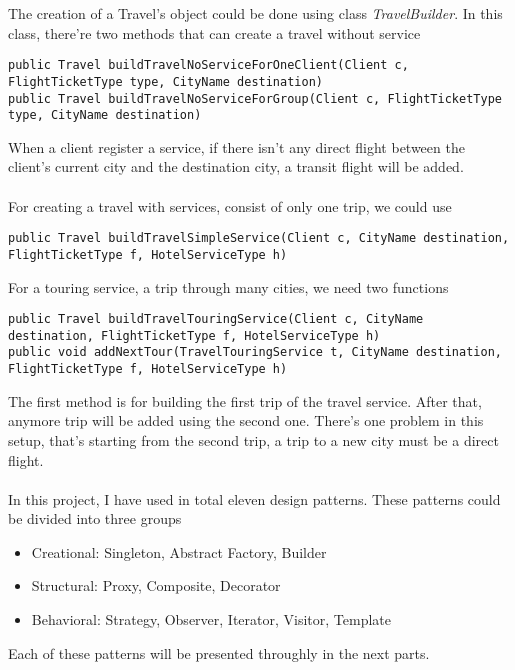 The creation of a Travel's object could be done using class \textit{TravelBuilder}. In this class, there're two methods that can create a travel without service

\begin{lstlisting}
public Travel buildTravelNoServiceForOneClient(Client c, FlightTicketType type, CityName destination)
public Travel buildTravelNoServiceForGroup(Client c, FlightTicketType type, CityName destination)
\end{lstlisting}

When a client register a service, if there isn't any direct flight between the client's current city and the destination city, a transit flight will be added.  

\paragraph{}
For creating a travel with services, consist of only one trip, we could use

\begin{lstlisting}
public Travel buildTravelSimpleService(Client c, CityName destination, FlightTicketType f, HotelServiceType h)
\end{lstlisting}

For a touring service, a trip through many cities, we need two functions

\begin{lstlisting}
public Travel buildTravelTouringService(Client c, CityName destination, FlightTicketType f, HotelServiceType h)
public void addNextTour(TravelTouringService t, CityName destination, FlightTicketType f, HotelServiceType h)
\end{lstlisting}

The first method is for building the first trip of the travel service. After that, anymore trip will be added using the second one. There's one problem in this setup, that's starting from the second trip, a trip to a new city must be a direct flight.


\paragraph{}
In this project, I have used in total eleven design patterns. These patterns could be divided into three groups

\begin{itemize}
\item Creational: Singleton, Abstract Factory, Builder
\item Structural: Proxy, Composite, Decorator
\item Behavioral: Strategy, Observer, Iterator, Visitor, Template
\end{itemize}

Each of these patterns will be presented throughly in the next parts.



